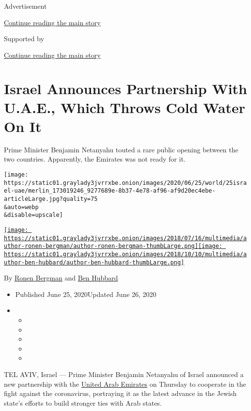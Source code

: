 Advertisement

\protect\hyperlink{after-top}{Continue reading the main story}

Supported by

\protect\hyperlink{after-sponsor}{Continue reading the main story}

\hypertarget{israel-announces-partnership-with-uae-which-throws-cold-water-on-it}{%
\section{Israel Announces Partnership With U.A.E., Which Throws Cold
Water On
It}\label{israel-announces-partnership-with-uae-which-throws-cold-water-on-it}}

Prime Minister Benjamin Netanyahu touted a rare public opening between
the two countries. Apparently, the Emirates was not ready for it.

\texttt{[image: https://static01.graylady3jvrrxbe.onion/images/2020/06/25/world/25israel-uae/merlin\_173019246\_9277689e-8b37-4e78-af96-af9d20ec4ebe-articleLarge.jpg?quality=75\\\&auto=webp\\\&disable=upscale]}

\href{https://www.nytimes3xbfgragh.onion/by/ronen-bergman}{\texttt{[image: https://static01.graylady3jvrrxbe.onion/images/2018/07/16/multimedia/author-ronen-bergman/author-ronen-bergman-thumbLarge.png]}}\href{https://www.nytimes3xbfgragh.onion/by/ben-hubbard}{\texttt{[image: https://static01.graylady3jvrrxbe.onion/images/2018/10/10/multimedia/author-ben-hubbard/author-ben-hubbard-thumbLarge.png]}}

By \href{https://www.nytimes3xbfgragh.onion/by/ronen-bergman}{Ronen
Bergman} and
\href{https://www.nytimes3xbfgragh.onion/by/ben-hubbard}{Ben Hubbard}

\begin{itemize}
\item
  Published June 25, 2020Updated June 26, 2020
\item
  \begin{itemize}
  \item
  \item
  \item
  \item
  \item
  \end{itemize}
\end{itemize}

TEL AVIV, Israel --- Prime Minister Benjamin Netanyahu of Israel
announced a new partnership with the
\href{https://www.nytimes3xbfgragh.onion/2020/07/14/science/mars-united-arab-emirates.html}{United
Arab Emirates} on Thursday to cooperate in the fight against the
coronavirus, portraying it as the latest advance in the Jewish state's
efforts to build stronger ties with Arab states.

